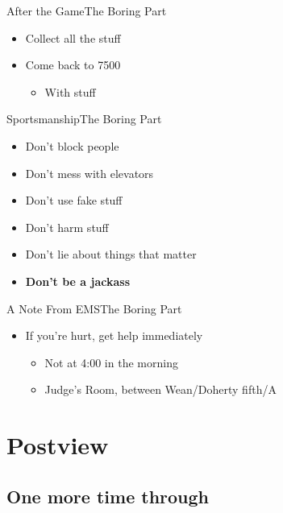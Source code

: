 \documentclass[17pt]{beamer}
\newcommand{\flavortext}[1]{}
\newcommand{\subitem}[1]{\begin{itemize} \item #1 \end{itemize}}
\begin{document}
\begin{frame}{After the Game}{The Boring Part}
  \begin{itemize}
     \item Collect all the stuff
     \item Come back to 7500
     \subitem{With stuff}
   \end{itemize}
\end{frame}

\begin{frame}{Sportsmanship}{The Boring Part}
  \begin{itemize}
   \item Don't block people
   \item Don't mess with elevators
   \item Don't use fake stuff
   \item Don't harm stuff
   \item Don't lie about things that matter
   \item \textbf{Don't be a jackass}
  \end{itemize}
\end{frame}

\begin{frame}{A Note From EMS}{The Boring Part}
  \begin{itemize}
  \item If you're hurt, get help immediately
  \begin{itemize}
    \item Not at 4:00 in the morning
    \item Judge's Room, between Wean/Doherty fifth/A
  \end{itemize}
  \end{itemize}
\end{frame}

\section{Postview}
\subsection{One more time through}
\end{document}
